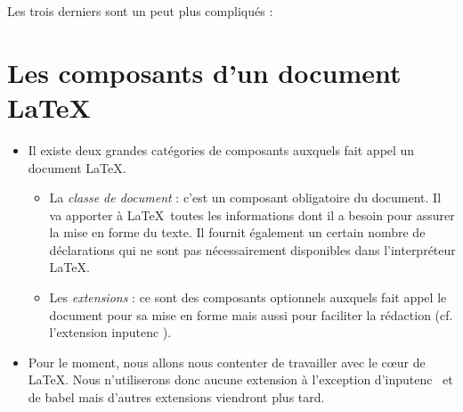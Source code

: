 \begin{flushleft}
\end{flushleft}

Les trois derniers sont un peut plus compliqués :



\section{Les composants d'un document \LaTeX}

\begin{itemize}
\item Il existe deux grandes catégories de composants auxquels fait
  appel un document \LaTeX.
  \begin{itemize}
  \item La \emph{classe de document} : c'est un composant obligatoire
    du document. Il va apporter à \LaTeX\ toutes les informations dont
    il a besoin pour assurer la mise en forme du texte. Il fournit
    également un certain nombre de déclarations qui ne sont pas
    nécessairement disponibles dans l'interpréteur \LaTeX.
  \item Les \emph{extensions} : ce sont des composants optionnels
    auxquels fait appel le document pour sa mise en forme mais aussi
    pour faciliter la rédaction (cf. l'extension \og inputenc \fg).
  \end{itemize}
\item Pour le moment, nous allons nous contenter de travailler avec le
  c\oe{}ur de \LaTeX. Nous n'utiliserons donc aucune extension à
  l'exception d'\og inputenc \fg\ et de \og babel \fg mais d'autres
  extensions viendront plus tard.
\end{itemize}





